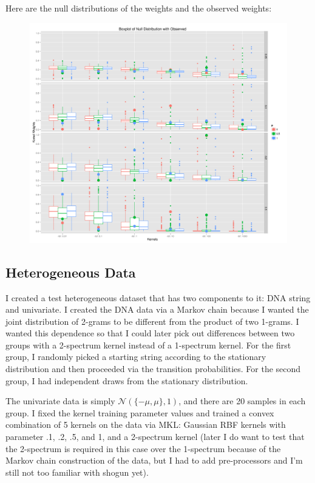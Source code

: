 Here are the null distributions of the weights and the observed weights:
\begin{figure}[!ht]
  \centering
  \includegraphics[scale=.3]{vectorial_weights.png}
\end{figure}

\subsection{Heterogeneous Data}
I created a test
heterogeneous dataset that has two components to it: DNA string and
univariate.  I created the DNA data via a Markov chain because I
wanted the joint distribution of 2-grams to be different from the
product of two 1-grams.  I wanted this dependence so that I could
later pick out differences between two groups with a 2-spectrum kernel
instead of a 1-spectrum kernel.  For the first group, I randomly
picked a starting string according to the stationary distribution and
then proceeded via the transition probabilities.  For the second
group, I had independent draws from the stationary distribution.

The univariate data is simply $\mathcal{N}(\{-\mu, \mu\}, 1)$, and there are 20
samples in each group.  I fixed the kernel training parameter values
and trained a convex combination of 5 kernels on the data via MKL:
Gaussian RBF kernels with parameter .1, .2, .5, and 1, and a
2-spectrum kernel (later I do want to test that the 2-spectrum is
required in this case over the 1-spectrum because of the Markov chain
construction of the data, but I had to add pre-processors and I'm
still not too familiar with shogun yet).


